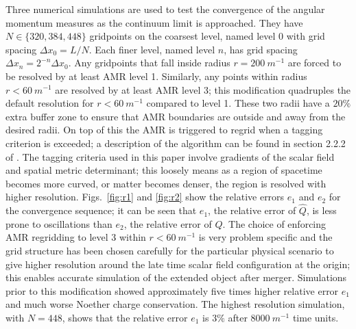 Three numerical simulations are used to test the convergence of the angular momentum measures as the continuum limit is approached. They have $N\in\{320,384,448\}$ gridpoints on the coarsest level, named level $0$ with grid spacing $\Delta x_0 = L/N$. Each finer level, named level $n$, has grid spacing $\Delta x_n = 2^{-n} \Delta x_0$. Any gridpoints that fall inside radius $r= 200 ~m^{-1}$ are forced to be resolved by at least AMR level 1. Similarly, any points within radius $r<60 ~m^{-1}$ are resolved by at least AMR level 3; this modification quadruples the default resolution for $r<60 ~m^{-1}$ compared to level 1. These two radii have a $20\%$ extra buffer zone to ensure that AMR boundaries are outside and away from the desired radii. On top of this the AMR is triggered to regrid when a tagging criterion is exceeded; a description of the algorithm can be found in section 2.2.2 of \cite{Clough_2015}. The tagging criteria used in this paper involve gradients of the scalar field and spatial metric determinant; this loosely means as a region of spacetime becomes more curved, or matter becomes denser, the region is resolved with higher resolution. Figs.~\ref{fig:r1} and \ref{fig:r2} show the relative errors $e_1$ and $e_2$ for the convergence sequence; it can be seen that $e_1$, the relative error of $\hat Q$, is less prone to oscillations than $e_2$, the relative error of $Q$. The choice of enforcing AMR regridding to level 3 within $r<60 ~m^{-1}$ is very problem specific and the grid structure has been chosen carefully for the particular physical scenario to give higher resolution around the late time scalar field configuration at the origin; this enables accurate simulation of the extended object after merger. Simulations prior to this modification showed approximately five times higher relative error $e_1$ and much worse Noether charge conservation. The highest resolution simulation, with $N=448$, shows that the relative error $e_1$ is $3\%$ after $8000 ~m^{-1}$ time units.




